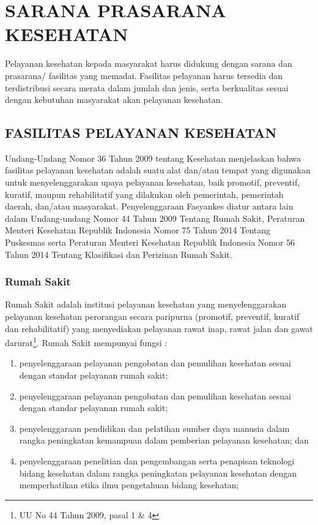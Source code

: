 \chapter{SARANA PRASARANA KESEHATAN}
Pelayanan kesehatan kepada masyarakat harus didukung dengan sarana dan prasarana/ fasilitas yang memadai. Fasilitas pelayanan harus tersedia dan terdistribusi secara merata dalam jumlah dan jenis, serta berkualitas sesuai dengan kebutuhan masyarakat akan pelayanan kesehatan. 

\section{FASILITAS PELAYANAN KESEHATAN}
Undang-Undang Nomor 36 Tahun 2009 tentang Kesehatan menjelaskan bahwa fasilitas pelayanan kesehatan adalah suatu alat dan/atau tempat yang digunakan untuk menyelenggarakan upaya pelayanan kesehatan, baik promotif, preventif, kuratif, maupun rehabilitatif yang dilakukan oleh pemerintah, pemerintah daerah, dan/atau masyarakat. Penyelenggaraan Fasyankes diatur antara lain dalam Undang-undang Nomor 44 Tahun 2009 Tentang Rumah Sakit, Peraturan Menteri Kesehatan Republik Indonesia Nomor 75 Tahun 2014 Tentang Puskesmas serta Peraturan Menteri Kesehatan Republik Indonesia Nomor 56 Tahun 2014 Tentang Klasifikasi dan Perizinan Rumah Sakit.

\subsection{Rumah Sakit}
Rumah Sakit adalah institusi pelayanan kesehatan yang menyelenggarakan pelayanan kesehatan perorangan secara paripurna (promotif, preventif, kuratif dan rehabilitatif) yang menyediakan pelayanan rawat inap, rawat jalan dan gawat darurat\footnote{UU No 44 Tahun 2009, pasal 1 \& 4}. Rumah Sakit mempunyai fungsi :
\begin{enumerate}
  \item penyelenggaraan pelayanan pengobatan dan pemulihan kesehatan sesuai dengan standar pelayanan rumah sakit;
  \item penyelenggaraan pelayanan pengobatan dan pemulihan kesehatan sesuai dengan standar pelayanan rumah sakit;
  \item penyelenggaraan pendidikan dan pelatihan sumber daya manusia dalam rangka peningkatan kemampuan dalam pemberian pelayanan kesehatan; dan
  \item penyelenggaraan penelitian dan pengembangan serta penapisan teknologi bidang kesehatan dalam rangka peningkatan pelayanan kesehatan dengan memperhatikan etika ilmu pengetahuan bidang kesehatan;
\end{enumerate}

